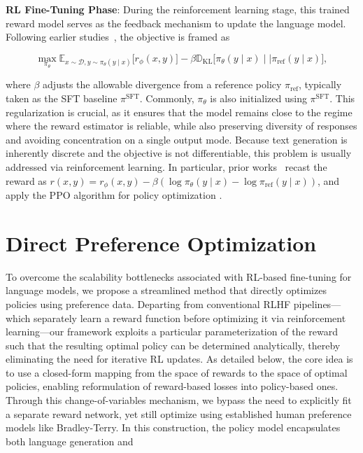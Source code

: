 \textbf{RL Fine-Tuning Phase}: During the reinforcement learning stage, this trained reward model serves as the feedback mechanism to update the language model. Following earlier studies~\citep{jaques2017sequence, jaques2020human}, the objective is framed as

\begin{equation}\label{eq:RL}
\max_{\pi_{\theta}}  \mathbb{E}_{x\sim \mathcal{D}, y\sim \pi_{\theta}(y \mid x)}\bigl[r_{\phi}(x, y)\bigr] - \beta\mathbb{D}_{\textrm{KL}}\bigl[\pi_{\theta}(y\mid x)\mid \mid \pi_\text{ref}(y\mid x)\bigr],
\end{equation}

where $\beta$ adjusts the allowable divergence from a reference policy $\pi_\text{ref}$, typically taken as the SFT baseline $\pi^\text{SFT}$. 
Commonly, $\pi_\theta$ is also initialized using $\pi^\text{SFT}$. This regularization is crucial, as it ensures that the model remains close to the regime where the reward estimator is reliable, while also preserving diversity of responses and avoiding concentration on a single output mode. Because text generation is inherently discrete and the objective is not differentiable, this problem is usually addressed via reinforcement learning. In particular, prior works~\citep{ziegler2020finetuning, stiennon2022learning, bai2022training, ouyang2022training} recast the reward as ${r(x, y) = r_{\phi}(x, y) -\beta (\log \pi_{\theta}(y\mid x) - \log \pi_\text{ref}(y\mid x))}$, and apply the PPO algorithm for policy optimization \cite{schulman2017proximal}. 

\section{Direct Preference Optimization}\label{sec:DPO}

To overcome the scalability bottlenecks associated with RL-based fine-tuning for language models, we propose a streamlined method that directly optimizes policies using preference data. Departing from conventional RLHF pipelines—which separately learn a reward function before optimizing it via reinforcement learning—our framework exploits a particular parameterization of the reward such that the resulting optimal policy can be determined analytically, thereby eliminating the need for iterative RL updates. As detailed below, the core idea is to use a closed-form mapping from the space of rewards to the space of optimal policies, enabling reformulation of reward-based losses into policy-based ones. Through this change-of-variables mechanism, we bypass the need to explicitly fit a separate reward network, yet still optimize using established human preference models like Bradley-Terry. In this construction, the policy model encapsulates both language generation and

